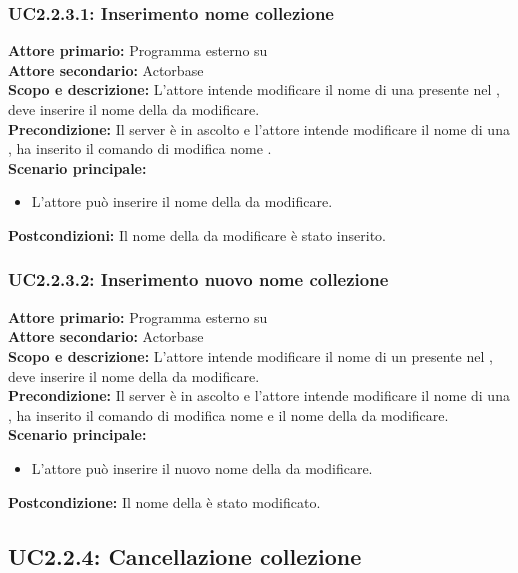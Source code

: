 \documentclass{scalatekids-article}
\begin{document}
\subsubsection{UC2.2.3.1: Inserimento nome collezione}

\textbf{Attore primario:} Programma esterno su \\
\textbf{Attore secondario:} Actorbase\\
\textbf{Scopo e descrizione:} L'attore intende modificare il nome di una  presente nel , deve inserire il nome della  da modificare.\\
\textbf{Precondizione:} Il server è in ascolto e l'attore intende modificare il nome di una , ha inserito il comando di modifica nome .\\
\textbf{Scenario principale:}
\begin{itemize}
\item L'attore può inserire il nome della  da modificare.
\end{itemize}
\textbf{Postcondizioni:} Il nome della  da modificare è stato inserito.

\subsubsection{UC2.2.3.2: Inserimento nuovo nome collezione}

\textbf{Attore primario:} Programma esterno su \\
\textbf{Attore secondario:} Actorbase\\
\textbf{Scopo e descrizione:} L'attore intende modificare il nome di un  presente nel , deve inserire il nome della  da modificare.\\
\textbf{Precondizione:} Il server è in ascolto e l'attore intende modificare il nome di una , ha inserito il comando di modifica nome  e il nome della  da modificare.\\
\textbf{Scenario principale:}
\begin{itemize}
\item L'attore può inserire il nuovo nome della  da modificare.
\end{itemize}
\textbf{Postcondizione:} Il nome della  è stato modificato.

\subsection{UC2.2.4: Cancellazione collezione}
\end{document}
